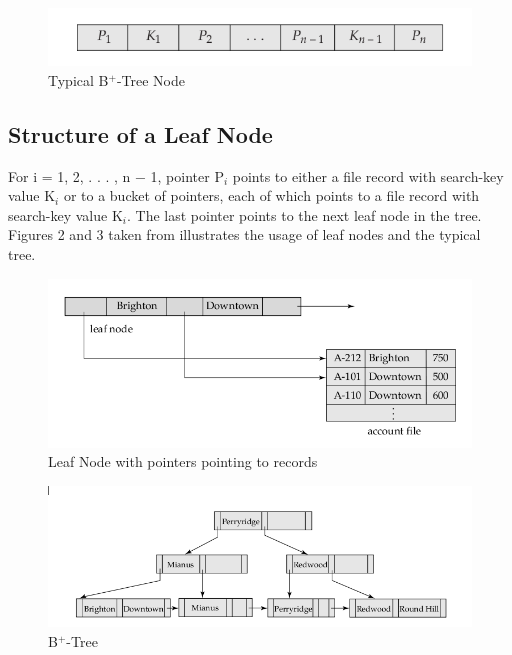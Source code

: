 \documentclass[11pt, oneside, a4paper]{article}
\begin{document}
\begin{figure}[htb]
\begin{center}
\ifpdf
	\includegraphics[scale=0.42]{./typicalBplusNode.png}
\else
\fi
\caption{Typical B$^+$-Tree Node}
\label{fig:1}
\end{center}
\end{figure}

\subsection{Structure of a Leaf Node}
For i = 1, 2, . . . , n − 1, pointer P$_i$ points to either a file record with search-key value K$_i$ or to a bucket of pointers, each of which points to a file record with search-key value K$_i$.  The last pointer points to the next leaf node in the tree.  Figures 2 and 3 taken from \cite{Korth} illustrates the usage of leaf nodes and the typical tree.
\begin{figure}[htb]
\begin{center}
\ifpdf
	\includegraphics[scale=0.35]{./leafNode.png}
\else
\fi
\caption{Leaf Node with pointers pointing to records}
\label{fig:2}
\end{center}
\end{figure}
\begin{figure}[htb]
\begin{center}
\ifpdf
	\includegraphics[scale=0.37]{./bplusTree.png}
\else
\fi
\caption{B$^+$-Tree}
\label{fig:3}
\end{center}
\end{figure}
\end{document}
